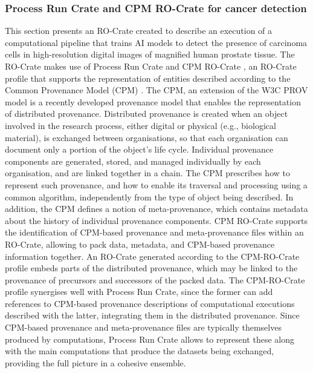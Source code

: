 \subsubsection{Process Run Crate and CPM RO-Crate for cancer detection}\label{ch54:process-run-crate-and-cpm-ro-crate-for-cancer-detection}

This section presents an RO-Crate created to describe an execution of a computational pipeline that trains AI models to detect the presence of carcinoma cells in high-resolution digital images of magnified human prostate tissue.
The RO-Crate makes use of Process Run Crate and CPM RO-Crate , an RO-Crate profile that supports the representation of entities described according to the Common Provenance Model (CPM) \cite{Wittner 2022,Wittner 2023}. 
The CPM, an extension of the W3C PROV model \cite{Moreau 2013} is a recently developed provenance model that enables the representation of distributed provenance. 
Distributed provenance is created when an object involved in the research process, either digital or physical (e.g., biological material), is exchanged between organisations, so that each organisation can document only a portion of the object’s life cycle. 
Individual provenance components are generated, stored, and managed individually by each organisation, and are linked together in a chain. 
The CPM prescribes how to represent such provenance, and how to enable its traversal and processing using a common algorithm, independently from the type of object being described. 
In addition, the CPM defines a notion of meta-provenance, which contains metadata about the history of individual provenance components. 
CPM RO-Crate supports the identification of CPM-based provenance and meta-provenance files within an RO-Crate, allowing to pack data, metadata, and CPM-based provenance information together. 
An RO-Crate generated according to the CPM-RO-Crate profile embeds parts of the distributed provenance, which may be linked to the provenance of precursors and successors of the packed data. 
The CPM-RO-Crate profile synergises well with Process Run Crate, since the former can add references to CPM-based provenance descriptions of computational executions described with the latter, integrating them in the distributed provenance. Since CPM-based provenance and meta-provenance files are typically themselves produced by computations, Process Run Crate allows to represent these along with the main computations that produce the datasets being exchanged, providing the full picture in a cohesive ensemble.


